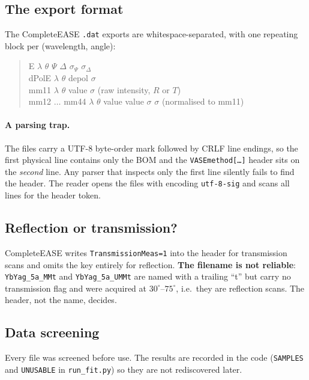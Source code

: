 \documentclass[11pt,a4paper]{article}
\newcommand{\lam}{\lambda}
\begin{document}
\subsection{The export format}

The CompleteEASE \texttt{.dat} exports are whitespace-separated, with one
repeating block per (wavelength, angle):

\begin{quote}\ttfamily\small
E \quad $\lam$ \quad $\theta$ \quad $\Psi$ \quad $\Delta$ \quad $\sigma_\Psi$ \quad $\sigma_\Delta$\\
dPolE \quad $\lam$ \quad $\theta$ \quad depol \quad $\sigma$\\
mm11 \quad $\lam$ \quad $\theta$ \quad value \quad $\sigma$ \hfill (raw intensity, $R$ or $T$)\\
mm12 $\ldots$ mm44 \quad $\lam$ \quad $\theta$ \quad value \quad value \quad $\sigma$ \quad $\sigma$ \hfill (normalised to mm11)
\end{quote}

\paragraph{A parsing trap.} The files carry a UTF-8 byte-order mark followed by
CRLF line endings, so the first physical line contains only the BOM and the
\texttt{VASEmethod[\ldots]} header sits on the \emph{second} line. Any parser
that inspects only the first line silently fails to find the header. The reader
opens the files with encoding \texttt{utf-8-sig} and scans all lines for the
header token.

\subsection{Reflection or transmission?}

CompleteEASE writes \texttt{TransmissionMeas=1} into the header for transmission
scans and omits the key entirely for reflection. \textbf{The filename is not
reliable}: \texttt{YbYag\_5a\_MMt} and \texttt{YbYag\_5a\_UMMt} are named with a
trailing ``t'' but carry no transmission flag and were acquired at
$30^\circ$--$75^\circ$, i.e.\ they are reflection scans. The header, not the
name, decides.

\subsection{Data screening}

Every file was screened before use. The results are recorded in the code
(\texttt{SAMPLES} and \texttt{UNUSABLE} in \texttt{run\_fit.py}) so they are not
rediscovered later.
\end{document}
